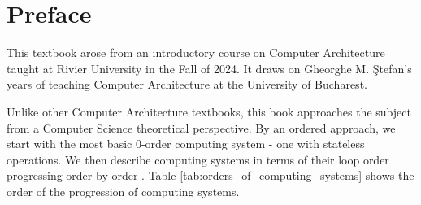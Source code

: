 \documentclass[11pt]{book}
\let\citeold\cite
\let\cite\citep
\let\citep\citeold
\begin{document}
\chapter*{Preface}

This textbook arose from an introductory course on Computer Architecture taught at Rivier University in the Fall of 2024. It draws on Gheorghe M. \c{S}tefan's years of teaching Computer Architecture at the University of Bucharest.

Unlike other Computer Architecture textbooks, this book approaches the subject from a Computer Science theoretical perspective. By an ordered approach, we start with the most basic 0-order computing system - one with stateless operations. We then describe computing systems in terms of their loop order progressing order-by-order \cite{stefan24}. Table \ref{tab:orders_of_computing_systems} shows the order of the progression of computing systems.
\end{document}
